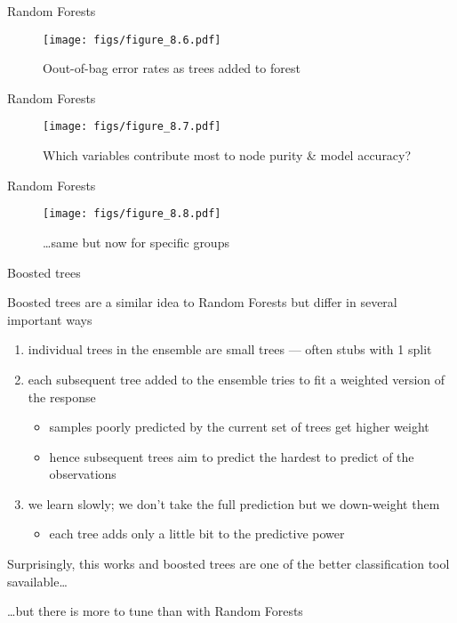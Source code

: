 \documentclass[11pt,ignorenonframetext,compress, aspectratio=169]{beamer}
\providecommand{\tightlist}{%
  \setlength{\itemsep}{0pt}\setlength{\parskip}{0pt}}
\begin{document}
\begin{frame}{Random Forests}

\begin{figure}[htbp]
\centering
\texttt{[image: figs/figure\_8.6.pdf]}
\caption{Oout-of-bag error rates as trees added to forest}
\end{figure}

\end{frame}

\begin{frame}{Random Forests}

\begin{figure}[htbp]
\centering
\texttt{[image: figs/figure\_8.7.pdf]}
\caption{Which variables contribute most to node purity \& model
accuracy?}
\end{figure}

\end{frame}

\begin{frame}{Random Forests}

\begin{figure}[htbp]
\centering
\texttt{[image: figs/figure\_8.8.pdf]}
\caption{\ldots{}same but now for specific groups}
\end{figure}

\end{frame}

\begin{frame}{Boosted trees}

Boosted trees are a similar idea to Random Forests but differ in several
important ways

\begin{enumerate}
\def\labelenumi{\arabic{enumi}.}
\tightlist
\item
  individual trees in the ensemble are small trees --- often stubs with
  1 split
\item
  each subsequent tree added to the ensemble tries to fit a weighted
  version of the response

  \begin{itemize}
  \tightlist
  \item
    samples poorly predicted by the current set of trees get higher
    weight
  \item
    hence subsequent trees aim to predict the hardest to predict of the
    observations
  \end{itemize}
\item
  we learn slowly; we don't take the full prediction but we down-weight
  them

  \begin{itemize}
  \tightlist
  \item
    each tree adds only a little bit to the predictive power
  \end{itemize}
\end{enumerate}

Surprisingly, this works and boosted trees are one of the better
classification tool savailable\ldots{}

\ldots{}but there is more to tune than with Random Forests

\end{frame}
\end{document}
